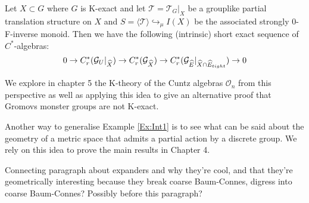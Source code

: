\begin{thm}
Let $X \subset G$ where $G$ is K-exact and let $\mathcal{T}=\mathcal{T}_{G}|_{X}$ be a grouplike partial translation structure on $X$ and $S=\langle \mathcal{T} \rangle \hookrightarrow_{\mu} I(X)$ be the associated strongly 0-F-inverse monoid. Then we have the following (intrinsic) short exact sequence of $C^{*}$-algebras:
\begin{equation*}
0 \rightarrow C^{*}_{r}(\mathcal{G}_{U}|_{\widehat{X}}) \rightarrow C^{*}_{r}(\mathcal{G}_{\widehat{X}}) \rightarrow C^{*}_{r}(\mathcal{G}_{\widehat{E}}|_{\widehat{X}\cap\widehat{E}_{tight}}) \rightarrow 0
\end{equation*}
\end{thm}

We explore in chapter 5 the K-theory of the Cuntz algebras $\mathcal{O}_{n}$ from this perspective as well as applying this idea to give an alternative proof that Gromovs monster groups are not K-exact.

Another way to generalise Example \ref{Ex:Int1} is to see what can be said about the geometry of a metric space that admits a partial action by a discrete group. We rely on this idea to prove the main results in Chapter 4. 

Connecting paragraph about expanders and why they're cool, and that they're geometrically interesting because they break coarse Baum-Connes, digress into coarse Baum-Connes? Possibly before this paragraph?

